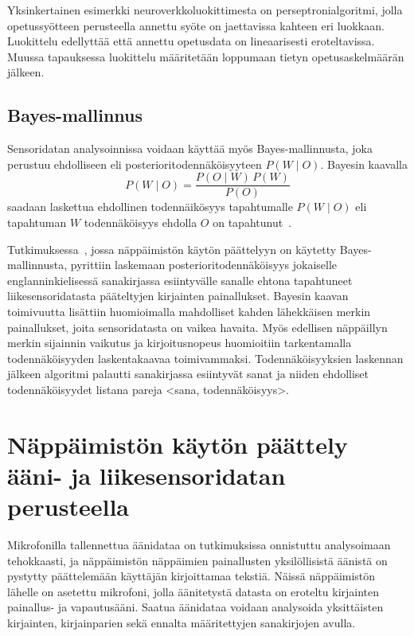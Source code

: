 \documentclass[finnish]{tktltiki2}
\theoremstyle{definition}
\theoremstyle{remark}
\begin{document}
Yksinkertainen esimerkki neuroverkkoluokittimesta on perseptronialgoritmi, jolla opetussyötteen perusteella annettu syöte on jaettavissa kahteen eri luokkaan. Luokittelu edellyttää että annettu opetusdata on lineaarisesti eroteltavissa. Muussa tapauksessa luokittelu määritetään loppumaan tietyn opetusaskelmäärän jälkeen.


\subsection{Bayes-mallinnus}
Sensoridatan analysoinnissa voidaan käyttää myös Bayes-mallinnusta, joka perustuu ehdolliseen eli posterioritodennäköisyyteen $ P(W \mid O)$. Bayesin kaavalla $$ P(W \mid O) = \frac{P(O \mid W) \, P(W)}{P(O)} $$ saadaan laskettua ehdollinen todennäikösyys tapahtumalle $ P(W \mid O)$ eli tapahtuman $W$ todennäköisyys ehdolla $O$ on tapahtunut~\cite{bar}.

Tutkimuksessa~\cite{mole}, jossa näppäimistön käytön päättelyyn on käytetty Bayes-mallinnusta, pyrittiin laskemaan posterioritodennäköisyys jokaiselle englanninkielisessä sanakirjassa esiintyvälle sanalle ehtona tapahtuneet liikesensoridatasta pääteltyjen kirjainten painallukset. Bayesin kaavan toimivuutta lisättiin huomioimalla mahdolliset kahden lähekkäisen merkin painallukset, joita sensoridatasta on vaikea havaita. Myös edellisen näppäillyn merkin sijainnin vaikutus ja kirjoitusnopeus huomioitiin tarkentamalla todennäköisyyden laskentakaavaa toimivammaksi. Todennäköisyyksien laskennan jälkeen algoritmi palautti sanakirjassa esiintyvät sanat ja niiden ehdolliset todennäköisyydet listana pareja <sana, todennäköisyys>.


\section{Näppäimistön käytön päättely ääni- ja liikesensoridatan perusteella}
Mikrofonilla tallennettua äänidataa on tutkimuksissa onnistuttu analysoimaan tehokkaasti, ja näppäimistön näppäimien painallusten yksilöllisistä äänistä on pystytty päättelemään käyttäjän kirjoittamaa tekstiä. Näissä näppäimistön lähelle on asetettu mikrofoni, jolla äänitetystä datasta on eroteltu kirjainten painallus- ja vapautusääni. Saatua äänidataa voidaan analysoida yksittäisten kirjainten, kirjainparien sekä ennalta määritettyjen sanakirjojen avulla.
\end{document}
